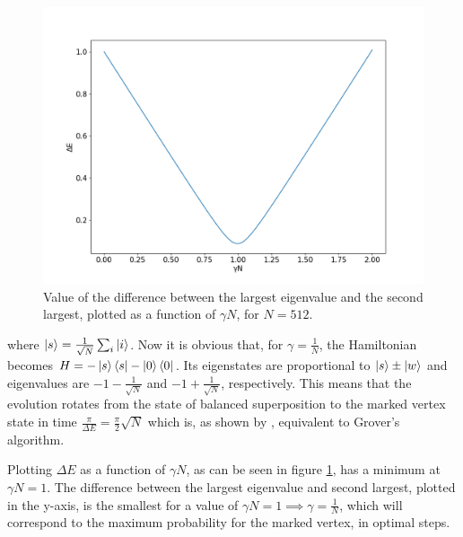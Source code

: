 \documentclass[../../dissertation.tex]{subfiles}
\begin{document}
\begin{figure}[h]
	\centering \includegraphics[scale=0.40]{img/ContQuantumWalk/Search/gamma512.png}
	\caption{Value of the difference between the largest eigenvalue and the second largest, plotted as a function of $\gamma N$, for $N=512$. }\label{fig:ContSearch}
	\label{fig:gamma512}
\end{figure}
where $\ket{s} = \frac{1}{\sqrt{N}}\sum_i \ket{i}$. Now it is obvious that, for
$\gamma = \frac{1}{N}$, the Hamiltonian becomes $H = -\ket{s}\bra{s} -
\ket{0}\bra{0}$. Its eigenstates are proportional to $\ket{s}\pm\ket{w}$ and
eigenvalues are $-1 - \frac{1}{\sqrt{N}}$ and $-1 + \frac{1}{\sqrt{N}}$,
respectively. This means that the evolution rotates from the state of balanced
superposition to the marked vertex state in time $\frac{\pi}{\Delta E} =
\frac{\pi}{2}\sqrt{N}$ which is, as shown by \cite{farhi2000}, equivalent to
Grover's algorithm.\par

Plotting $\Delta E$ as a function of $\gamma N$, as can be seen in figure
\ref{fig:gamma512}, has a minimum at $\gamma N =1$. The difference between the
largest eigenvalue and second largest, plotted in the y-axis, is the smallest
for a value of $\gamma N = 1 \implies \gamma =\frac{1}{N}$, which will
correspond to the maximum probability for the marked vertex, in optimal steps.\par
\end{document}
